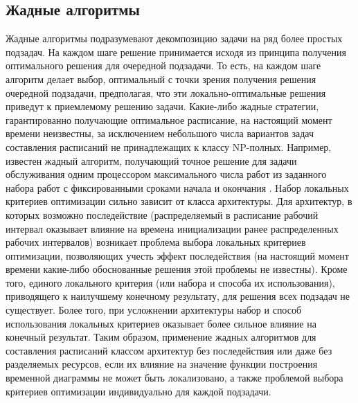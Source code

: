 \documentclass{article}
\begin{document}
\subsection{Жадные алгоритмы}
Жадные алгоритмы подразумевают декомпозицию задачи на ряд более простых подзадач. На каждом шаге решение принимается исходя из принципа получения оптимального решения для очередной подзадачи. То есть, на каждом шаге алгоритм делает выбор, оптимальный с точки зрения получения решения очередной подзадачи, предполагая, что эти локально-оптимальные решения приведут к приемлемому решению задачи. Какие-либо жадные стратегии, гарантированно получающие оптимальное расписание, на настоящий момент времени неизвестны, за исключением небольшого числа вариантов задач составления расписаний не принадлежащих к классу NP-полных. Например, известен жадный алгоритм, получающий точное решение для задачи обслуживания одним процессором максимального числа работ из заданного набора работ с фиксированными сроками начала и окончания \cite{Kormen_2001}. Набор локальных критериев оптимизации сильно зависит от класса архитектуры. Для архитектур, в которых возможно последействие (распределяемый в расписание рабочий интервал оказывает влияние на времена инициализации ранее распределенных рабочих интервалов) возникает проблема выбора локальных критериев оптимизации, позволяющих учесть эффект последействия (на настоящий момент времени какие-либо обоснованные решения этой проблемы не известны). Кроме того, единого локального критерия (или набора и способа их использования), приводящего к наилучшему конечному результату, для решения всех подзадач не существует. Более того, при усложнении архитектуры набор и способ использования локальных критериев оказывает более сильное влияние на конечный результат. Таким образом, применение жадных алгоритмов для составления расписаний классом архитектур без последействия или даже без разделяемых ресурсов, если их влияние на значение функции построения временной диаграммы не может быть локализовано, а также проблемой выбора критериев оптимизации индивидуально для каждой подзадачи.
\end{document}
